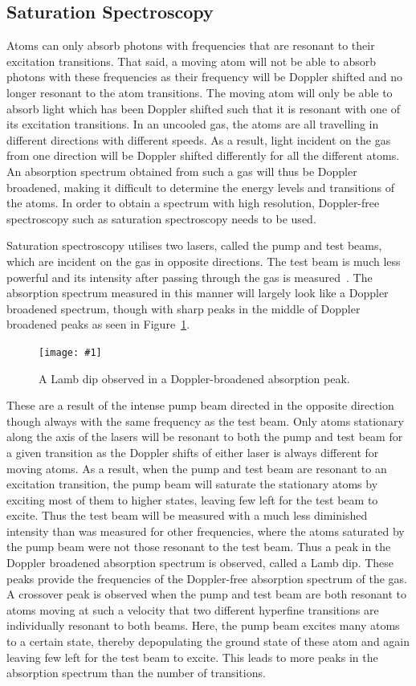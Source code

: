 \documentclass[twocolumn]{article}
\newcommand{\insertFigure}[1]{%
   \texttt{[image: \#1]}%
}
\begin{document}
\subsection{Saturation Spectroscopy}
Atoms can only absorb photons with frequencies that are resonant to their excitation transitions. That said, a moving atom will not be able to absorb photons with these frequencies as their frequency will be Doppler shifted and no longer resonant to the atom transitions. The moving atom will only be able to absorb light which has been Doppler shifted such that it is resonant with one of its excitation transitions. In an uncooled gas, the atoms are all travelling in different directions with different speeds. As a result, light incident on the gas from one direction will be Doppler shifted differently for all the different atoms. An absorption spectrum obtained from such a gas will thus be Doppler broadened, making it difficult to determine the energy levels and transitions of the atoms. In order to obtain a spectrum with high resolution, Doppler-free spectroscopy such as saturation spectroscopy needs to be used. \\
\par Saturation spectroscopy utilises two lasers, called the pump and test beams, which are incident on the gas in opposite directions. The test beam is much less powerful and its intensity after passing through the gas is measured~\cite{manual}. The absorption spectrum measured in this manner will largely look like a Doppler broadened spectrum, though with sharp peaks in the middle of Doppler broadened peaks as seen in Figure~\ref{fig:Lamb}. 
\begin{figure} [!h]
	\centering
	\insertFigure{Images/Lamb.png}
	\caption{A Lamb dip observed in a Doppler-broadened absorption peak.~\cite{manual}}
	\label{fig:Lamb}
\end{figure}
These are a result of the intense pump beam directed in the opposite direction though always with the same frequency as the test beam. Only atoms stationary along the axis of the lasers will be resonant to both the pump and test beam for a given transition as the Doppler shifts of either laser is always different for moving atoms. As a result, when the pump and test beam are resonant to an excitation transition, the pump beam will saturate the stationary atoms by exciting most of them to higher states, leaving few left for the test beam to excite. Thus the test beam will be measured with a much less diminished intensity than was measured for other frequencies, where the atoms saturated by the pump beam were not those resonant to the test beam. Thus a peak in the Doppler broadened absorption spectrum is observed, called a Lamb dip. These peaks provide the frequencies of the Doppler-free absorption spectrum of the gas. A crossover peak is observed when the pump and test beam are both resonant to atoms moving at such a velocity that two different hyperfine transitions are individually resonant to both beams. Here, the pump beam excites many atoms to a certain state, thereby depopulating the ground state of these atom and again leaving few left for the test beam to excite. This leads to more peaks in the absorption spectrum than the number of transitions.
\end{document}
